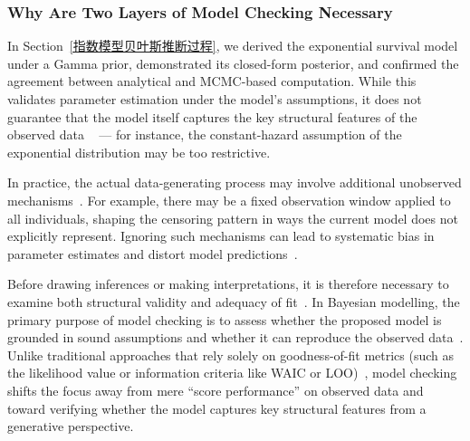 \subsubsection{Why Are Two Layers of Model Checking Necessary}
\label{subsec:wo Layers of Model Checking}
In Section~\ref{指数模型贝叶斯推断过程}, we derived the exponential survival model under a Gamma prior, demonstrated its closed-form posterior, and confirmed the agreement between analytical and MCMC-based computation. While this validates parameter estimation under the model’s assumptions,  it does not guarantee that the model itself captures the key structural features of the observed data ~\cite{62bfc978-09b1-3997-9776-380d0b45e9c2, gelman1995bayesian} — for instance, the constant-hazard assumption of the exponential distribution may be too restrictive.

In practice, the actual data-generating process may involve additional unobserved mechanisms~\cite{kalbfleisch2002statistical}. For example, there may be a fixed observation window applied to all individuals, shaping the censoring pattern in ways the current model does not explicitly represent. Ignoring such mechanisms can lead to systematic bias in parameter estimates and distort model predictions~\cite{stats5010006}.

Before drawing inferences or making interpretations, it is therefore necessary to examine both structural validity and adequacy of fit~\cite{62bfc978-09b1-3997-9776-380d0b45e9c2}. In Bayesian modelling, the primary purpose of model checking is to assess whether the proposed model is grounded in sound assumptions and whether it can reproduce the observed data~\cite{https://doi.org/10.1002/ecm.1314}. Unlike traditional approaches that rely solely on goodness-of-fit metrics (such as the likelihood value or information criteria like WAIC or LOO)~\cite{cho2025nonlinear, https://doi.org/10.1002/ecm.1314}, model checking shifts the focus away from mere “score performance” on observed data and toward verifying whether the model captures key structural features from a generative perspective. 

